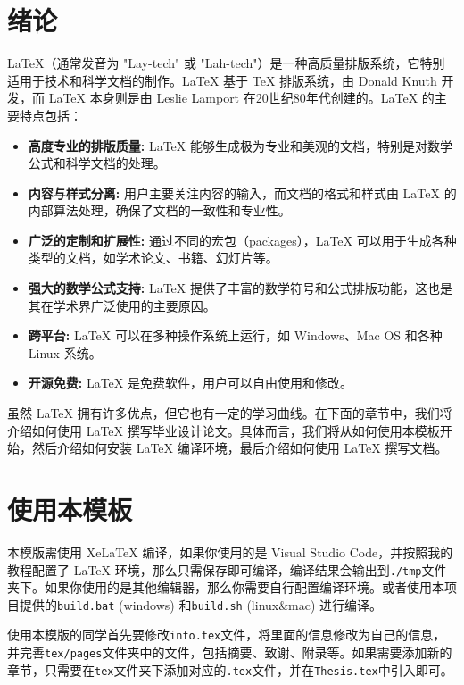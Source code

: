 \section{绪论}\label{sec:introduction}

LaTeX（通常发音为 "Lay-tech" 或 "Lah-tech"）是一种高质量排版系统，它特别适用于技术和科学文档的制作。LaTeX 基于 TeX 排版系统，由 Donald Knuth 开发，而 LaTeX 本身则是由 Leslie Lamport 在20世纪80年代创建的。LaTeX 的主要特点包括：

\begin{itemize}
    \item \textbf{高度专业的排版质量:} LaTeX 能够生成极为专业和美观的文档，特别是对数学公式和科学文档的处理。
    \item \textbf{内容与样式分离:} 用户主要关注内容的输入，而文档的格式和样式由 LaTeX 的内部算法处理，确保了文档的一致性和专业性。
    \item \textbf{广泛的定制和扩展性:} 通过不同的宏包（packages），LaTeX 可以用于生成各种类型的文档，如学术论文、书籍、幻灯片等。
    \item \textbf{强大的数学公式支持:} LaTeX 提供了丰富的数学符号和公式排版功能，这也是其在学术界广泛使用的主要原因。
    \item \textbf{跨平台:} LaTeX 可以在多种操作系统上运行，如 Windows、Mac OS 和各种 Linux 系统。
    \item \textbf{开源免费:} LaTeX 是免费软件，用户可以自由使用和修改。
\end{itemize}

虽然 LaTeX 拥有许多优点，但它也有一定的学习曲线。在下面的章节中，我们将介绍如何使用 LaTeX 撰写毕业设计论文。具体而言，我们将从如何使用本模板开始，然后介绍如何安装 LaTeX 编译环境，最后介绍如何使用 LaTeX 撰写文档。

\section{使用本模板}

本模版需使用 XeLaTeX 编译，如果你使用的是 Visual Studio Code，并按照我的教程配置了 LaTeX 环境，那么只需保存即可编译，编译结果会输出到\texttt{./tmp}文件夹下。如果你使用的是其他编辑器，那么你需要自行配置编译环境。或者使用本项目提供的\texttt{build.bat} (windows) 和\texttt{build.sh} (linux\&mac) 进行编译。

使用本模版的同学首先要修改\texttt{info.tex}文件，将里面的信息修改为自己的信息，并完善\texttt{tex/pages}文件夹中的文件，包括摘要、致谢、附录等。如果需要添加新的章节，只需要在\texttt{tex}文件夹下添加对应的\texttt{.tex}文件，并在\texttt{Thesis.tex}中引入即可。

